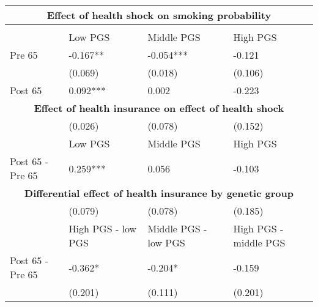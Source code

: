 % 
\begin{tabular}{llll}
  \toprule
  \multicolumn{4}{c}{ \textbf{Effect of health shock on smoking probability}} \\
 \midrule
 &  &  &  \\ 
   \midrule
 & Low PGS & Middle PGS & High PGS \\ 
  Pre 65 & -0.167** & -0.054*** & -0.121 \\ 
   & (0.069) & (0.018) & (0.106) \\ 
  Post 65 & 0.092*** & 0.002 & -0.223 \\ 
   \toprule \multicolumn{4}{c}{ \textbf{Effect of health insurance on effect of health shock}} \\
 \midrule
 & (0.026) & (0.078) & (0.152) \\ 
   \midrule
 & Low PGS & Middle PGS & High PGS \\ 
  Post 65 - Pre 65 & 0.259*** & 0.056 & -0.103 \\ 
   \toprule \multicolumn{4}{c}{ \textbf{Differential effect of health insurance by genetic group}} \\
 \midrule
 & (0.079) & (0.078) & (0.185) \\ 
   \midrule
 & High PGS - low PGS & Middle PGS - low PGS & High PGS - middle PGS \\ 
  Post 65 - Pre 65 & -0.362* & -0.204* & -0.159 \\ 
   & (0.201) & (0.111) & (0.201) \\ 
  \end{tabular}
